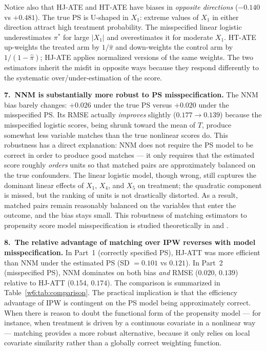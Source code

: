\documentclass[master.tex]{subfiles}
\begin{document}
Notice also that HJ-ATE and HT-ATE have biases in \emph{opposite
directions} ($-0.140$ vs $+0.481$).  The true PS is U-shaped in $X_1$:
extreme values of $X_1$ in either direction attract high treatment
probability.  The misspecified linear logistic underestimates $\pi^*$
for large $|X_1|$ and overestimates it for moderate $X_1$.  HT-ATE
up-weights the treated arm by $1/\hat\pi$ and down-weights the control
arm by $1/(1-\hat\pi)$; HJ-ATE applies normalized versions of the same
weights.  The two estimators inherit the misfit in opposite ways
because they respond differently to the systematic over/under-estimation
of the score.

\medskip
\noindent\textbf{7.\ NNM is substantially more robust to PS
misspecification.}
The NNM bias barely changes: $+0.026$ under the true PS versus $+0.020$
under the misspecified PS.  Its RMSE actually \emph{improves} slightly
($0.177 \to 0.139$) because the misspecified logistic scores, being
shrunk toward the mean of $T$, produce somewhat less variable matches
than the true nonlinear scores do.  This robustness has a direct
explanation: NNM does not require the PS model to be correct in order
to produce good matches --- it only requires that the estimated score
roughly \emph{orders} units so that matched pairs are approximately
balanced on the true confounders.  The linear logistic model, though
wrong, still captures the dominant linear effects of $X_1$, $X_4$, and
$X_5$ on treatment; the quadratic component is missed, but the ranking
of units is not drastically distorted.  As a result, matched pairs
remain reasonably balanced on the variables that enter the outcome, and
the bias stays small.
This robustness of matching estimators to propensity score model
misspecification is studied theoretically in
\citet{yang2016multilevel} and \citet{yang2023multiply}.

\medskip
\noindent\textbf{8.\ The relative advantage of matching over IPW
reverses with model misspecification.}
In Part~1 (correctly specified PS), HJ-ATT was more efficient than NNM
under the estimated PS (SD $= 0.101$ vs $0.121$).  In Part~2
(misspecified PS), NNM dominates on both bias \emph{and} RMSE
($0.020$, $0.139$) relative to HJ-ATT ($0.154$, $0.174$).  The
comparison is summarized in Table~\ref{w6:tab:comparison}.  The
practical implication is that the efficiency advantage of IPW is
contingent on the PS model being approximately correct.  When there is
reason to doubt the functional form of the propensity model --- for
instance, when treatment is driven by a continuous covariate in a
nonlinear way --- matching provides a more robust alternative, because
it only relies on local covariate similarity rather than a globally
correct weighting function.
\end{document}
